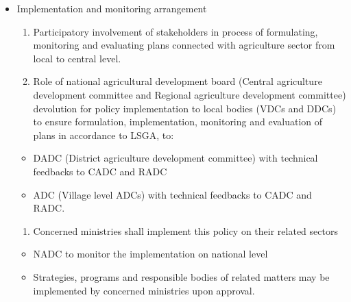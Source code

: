 \documentclass[]{book}
\providecommand{\tightlist}{%
  \setlength{\itemsep}{0pt}\setlength{\parskip}{0pt}}
\begin{document}
\begin{itemize}
\tightlist
\item
  Implementation and monitoring arrangement

  \begin{enumerate}
  \def\labelenumi{\arabic{enumi}.}
  \tightlist
  \item
    Participatory involvement of stakeholders in process of formulating, monitoring and evaluating plans connected with agriculture sector from local to central level.
  \item
    Role of national agricultural development board (Central agriculture development committee and Regional agriculture development committee) devolution for policy implementation to local bodies (VDCs and DDCs) to ensure formulation, implementation, monitoring and evaluation of plans in accordance to LSGA, to:
  \end{enumerate}

  \begin{itemize}
  \tightlist
  \item
    DADC (District agriculture development committee) with technical feedbacks to CADC and RADC
  \item
    ADC (Village level ADCs) with technical feedbacks to CADC and RADC.
  \end{itemize}

  \begin{enumerate}
  \def\labelenumi{\arabic{enumi}.}
  \setcounter{enumi}{2}
  \tightlist
  \item
    Concerned ministries shall implement this policy on their related sectors
  \end{enumerate}

  \begin{itemize}
  \tightlist
  \item
    NADC to monitor the implementation on national level
  \item
    Strategies, programs and responsible bodies of related matters may be implemented by concerned ministries upon approval.
  \end{itemize}
\end{itemize}


\end{document}
